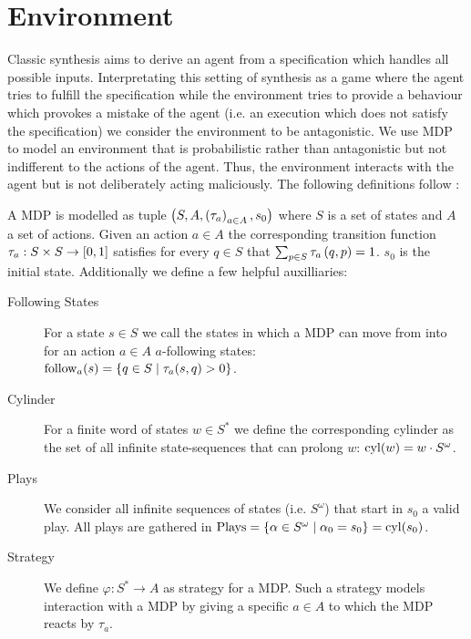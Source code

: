 \chapter{Environment}
Classic synthesis aims to derive an agent from a specification which handles
all possible inputs. Interpretating this setting of synthesis as a game where
the agent tries to fulfill the specification while the environment tries to
provide a behaviour which provokes a mistake of the agent (i.e. an execution
which does not satisfy the specification) we consider the environment to be
antagonistic. We use \ac{MDP} to model an environment that is probabilistic
rather than antagonistic but not indifferent to the actions of the agent. Thus,
the environment interacts with the agent but is not deliberately acting
maliciously. The following definitions follow \cite{RandAutoInfTrees}:

\begin{definition}
  A \acl*{MDP} is modelled as tuple
  $\left(S, A, \left(\tau_{a}\right)_{a\in A}, s_{0}\right)$ where $S$ is a set of states
  and $A$ a set of actions. Given an action $a\in A$ the corresponding
  transition function $\tau_{a}:S\times S\rightarrow \left[0,1\right]$ satisfies
  for every $q\in S$ that $\sum_{p\in S}\tau_{a}\left(q,p\right) = 1$.
  $s_{0}$ is the initial state. Additionally we define a few helpful
  auxilliaries:
  \begin{description}
    \item [Following States] For a state $s\in S$ we call the states in which a
      \ac{MDP} can move from into for an action $a\in A$ $a$-following states:\\
      $\operatorname{follow}_{a}(s) = \left\{q\in S\mid \tau_{a}(s,q) > 0\right\}$.
    \item [Cylinder] For a finite word of states $w\in S^{*}$ we define the
      corresponding cylinder as the set of all infinite state-sequences
      that can prolong $w$: $\operatorname{cyl}(w) = w\cdot S^{\omega}$.
    \item [Plays] We consider all infinite sequences of states
      (i.e. $S^{\omega}$) that start in $s_{0}$ a valid play. All plays
      are gathered in $\operatorname{Plays} = \left\{
        \alpha\in S^{\omega}\mid \alpha_{0} = s_{0}\right\} = \operatorname{cyl}(s_{0})$.
    \item [Strategy] We define $\varphi:S^{*}\rightarrow A$ as strategy for
      a \ac{MDP}. Such a strategy models interaction with a \ac{MDP} by
      giving a specific $a\in A$ to which the \ac{MDP} reacts by $\tau_{a}$.
  \end{description}
\end{definition}

